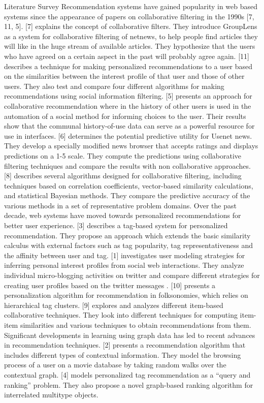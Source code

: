 \documentclass{report}
\begin{document}
\begin{projChapter}{Literature Survey}
 Recommendation systems have gained popularity in web based systems since the appearance of papers on collaborative filtering in the 1990s [7, 11, 5].
[7] explains the concept of collaborative filters. They introduce GroupLens as a system for collaborative filtering of netnews, to help people find articles they will like in the huge stream of available articles. They hypothesize that the users who have agreed on a certain aspect in the past will probably agree again.
[11] describes a technique for making personalized recommendations to a user based on the similarities between the interest profile of that user and those of other users. They also test and compare four different algorithms for making recommendations using social information filtering.
[5] presents an approach for collaborative recommendation where in the history of other users is used in the automation of a social method for informing choices to the user. Their results show that the communal history-of-use data can serve as a powerful resource for use in interfaces.
[6] determines the potential predictive utility for Usenet news. They develop a specially modified news browser that accepts ratings and displays predictions on a 1-5 scale. They compute the predictions using collaborative filtering techniques and compare the results with non collaborative approaches.
[8] describes several algorithms designed for collaborative filtering, including techniques based on correlation coefficients, vector-based similarity calculations, and statistical Bayesian methods. They compare the predictive accuracy of the various methods in a set of representative problem domains. Over the past decade, web systems have moved towards personalized recommendations for better user experience.
[3] describes a tag-based system for personalized recommendation. They propose an approach which extends the basic similarity calculus with external factors such as tag 
popularity, tag representativeness and the affinity between user and tag.
[1] investigates user modeling strategies for inferring personal interest profiles from social web interactions. They analyze individual micro-blogging activities on twitter and compare different strategies for creating user profiles based on the twitter messages
.
[10] presents a personalization algorithm for recommendation in folksonomies, which relies on hierarchical tag clusters.
[9] explores and analyzes different item-based collaborative techniques. They look into different techniques for computing item-item similarities and various techniques to obtain recommendations from them. Significant developments in learning using graph data has led to recent advances in recommendation techniques.
[2] presents a recommendation algorithm that includes different types of contextual information. They model the browsing process of a user on a movie database by taking random walks over the contextual graph.
[4] models personalized tag recommendation as a “query and ranking” problem. They also propose a novel graph-based ranking algorithm for interrelated multitype objects.
\end{projChapter}
\end{document}
